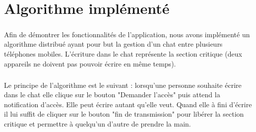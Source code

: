 \documentclass[a4paper,10pt]{report}
\begin{document}
    
    
    
  \paragraph{}

\chapter{Algorithme implémenté}
\paragraph{}
Afin de démontrer les fonctionnalités de l'application, nous avons implémenté un algorithme distribué ayant pour but la gestion d'un chat entre plusieurs téléphones mobiles. L'écriture dans le chat représente la section critique (deux appareils ne doivent pas pouvoir écrire en même temps).
\paragraph{}
Le principe de l'algorithme est le suivant : lorsqu'une personne souhaite écrire dans le chat elle clique sur le bouton "Demander l'accès" puis attend la notification d'accès.
Elle peut écrire autant qu'elle veut.
Quand elle à fini d'écrire il lui suffit de cliquer sur le bouton "fin de transmission" pour libérer la section critique et permettre à quelqu'un d'autre de prendre la main.
\end{document}
